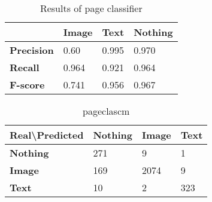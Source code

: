 
\begin{table}
\centering
\begin{tabular}{l l l l}
\hline
  & \textbf{Image} & \textbf{Text} & \textbf{Nothing} \\\hline
\textbf{Precision} & 0.60  & 0.995 & 0.970 \\
\textbf{Recall} & 0.964  & 0.921 & 0.964 \\
\textbf{F-score} & 0.741 & 0.956 & 0.967 \\\hline
\end{tabular}
\caption{Results of page classifier}
\label{tab:pageclasresults}
\end{table}

\begin{table}
\centering
\begin{tabular}{l l l l}
\hline
Real\textbackslash Predicted & \textbf{Nothing} & \textbf{Image} & \textbf{Text} \\\hline
\textbf{Nothing} & 271 & 9 & 1 \\
\textbf{Image} & 169 & 2074 & 9 \\
\textbf{Text} & 10 & 2 & 323\\
\hline
\end{tabular}
\caption{pageclascm}
\label{tab:pageclascm}
\end{table}
